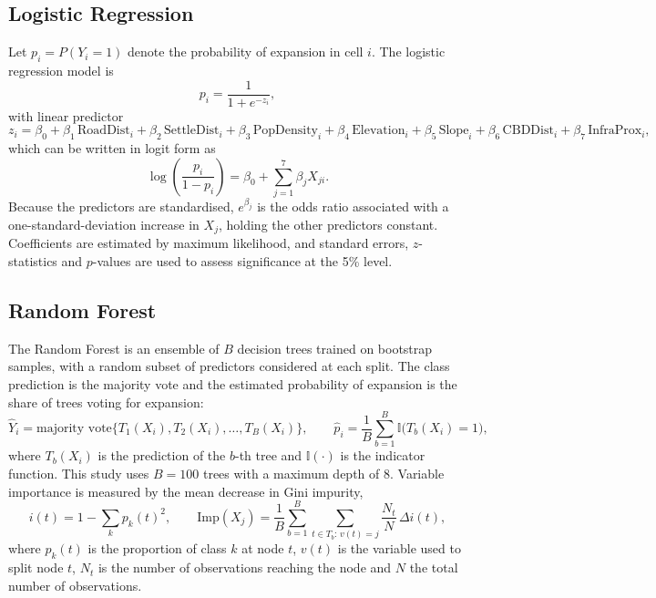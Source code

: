 \subsection{Logistic Regression}

Let $p_i = P(Y_i = 1)$ denote the probability of expansion in cell $i$. The
logistic regression model is
\begin{equation}
p_i = \frac{1}{1 + e^{-z_i}}, \label{eq:logistic}
\end{equation}
with linear predictor
\begin{equation}
z_i = \beta_0 + \beta_1\,\text{RoadDist}_i + \beta_2\,\text{SettleDist}_i
+ \beta_3\,\text{PopDensity}_i + \beta_4\,\text{Elevation}_i
+ \beta_5\,\text{Slope}_i + \beta_6\,\text{CBDDist}_i
+ \beta_7\,\text{InfraProx}_i, \label{eq:linpred}
\end{equation}
which can be written in logit form as
\begin{equation}
\log\!\left(\frac{p_i}{1-p_i}\right) = \beta_0 + \sum_{j=1}^{7}\beta_j X_{ji}.
\label{eq:logit}
\end{equation}
Because the predictors are standardised, $e^{\beta_j}$ is the odds ratio
associated with a one-standard-deviation increase in $X_j$, holding the other
predictors constant. Coefficients are estimated by maximum likelihood, and
standard errors, $z$-statistics and $p$-values are used to assess significance
at the 5\% level.

\subsection{Random Forest}

The Random Forest is an ensemble of $B$ decision trees trained on bootstrap
samples, with a random subset of predictors considered at each split. The
class prediction is the majority vote and the estimated probability of
expansion is the share of trees voting for expansion:
\begin{equation}
\hat{Y}_i = \text{majority vote}\{T_1(X_i), T_2(X_i), \ldots, T_B(X_i)\},
\qquad
\hat{p}_i = \frac{1}{B}\sum_{b=1}^{B} \mathbb{I}\big(T_b(X_i) = 1\big),
\label{eq:rf}
\end{equation}
where $T_b(X_i)$ is the prediction of the $b$-th tree and $\mathbb{I}(\cdot)$ is
the indicator function. This study uses $B = 100$ trees with a maximum depth of
8. Variable importance is measured by the mean decrease in Gini impurity,
\begin{equation}
i(t) = 1 - \sum_{k} p_k(t)^2, \qquad
\text{Imp}(X_j) = \frac{1}{B}\sum_{b=1}^{B}\sum_{t \in T_b:\, v(t)=j}
\frac{N_t}{N}\,\Delta i(t),
\label{eq:gini}
\end{equation}
where $p_k(t)$ is the proportion of class $k$ at node $t$, $v(t)$ is the
variable used to split node $t$, $N_t$ is the number of observations reaching
the node and $N$ the total number of observations.

